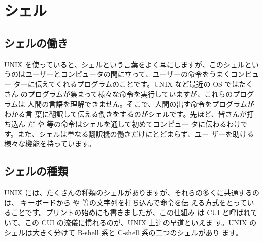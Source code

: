 \documentclass[platex]{jsarticle}
\begin{document}

%

\section{シェル}

 \subsection{シェルの働き}
 UNIX を使っていると、シェルという言葉をよく耳にしますが、このシェルとい
 うのはユーザーとコンピュータの間に立って、ユーザーの命令をうまくコンピュー
 ターに伝えてくれるプログラムのことです。UNIX など最近の OS ではたくさん
 のプログラムが集まって様々な命令を実行していますが、これらのプログラムは
 人間の言語を理解できません。そこで、人間の出す命令をプログラムがわかる言
 葉に翻訳して伝える働きをするのがシェルです。先ほど、皆さんが打ち込ん
 だ  や  等の命令はシェルを通して初めてコンピュー
 タに伝わるわけです。また、シェルは単なる翻訳機の働きだけにとどまらず、ユー
 ザーを助ける様々な機能を持っています。


 \subsection{シェルの種類}
 UNIX には、たくさんの種類のシェルがありますが、それらの多くに共通するのは、
 キーボードから  や  等の文字列を打ち込んで命令を伝
 える方式をとっていることです。プリントの始めにも書きましたが、この仕組み
 は CUI と呼ばれていて、この CUI の流儀に慣れるのが、UNIX 上達の早道といえま
 す。UNIX のシェルは大きく分けて B-shell 系と C-shell 系の二つのシェルがあり
 ます。
\end{document}
